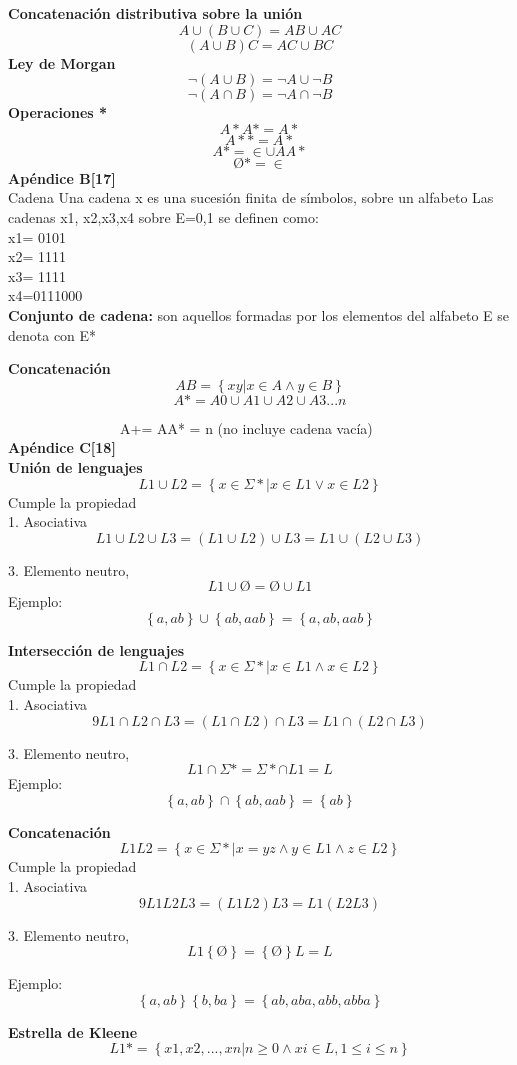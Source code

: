 \documentclass{llncs}
\begin{document}
   \textbf{Concatenación distributiva sobre la unión}
 \[
 A \cup (B \cup C) = AB \cup AC
  \]
\[
( A \cup B)  C = AC \cup BC
  \]
  \textbf{Ley de Morgan }
 \[
\neg (A \cup B)= \neg A \cup  \neg B
  \]
\[
\neg(A \cap B)= \neg A \cap  \neg B
  \] 
\textbf{Operaciones *}
\[ 
A* A* = A*
\]
\[ 
A** =A*
  \] 
\[ 
A*= { \in } \cup AA*
  \]
\[ 
Ø*={\in}
  \] 
  \textbf{Apéndice  B[17]} \\  
  Cadena
Una cadena x es una sucesión finita de símbolos, sobre un alfabeto
Las cadenas x1, x2,x3,x4 sobre E={0,1} se definen como:\\
x1= 0101 \\
x2= 1111 \\
x3= 1111 \\
x4=0111000 \\

\textbf{Conjunto de cadena:} son aquellos formadas por los elementos del alfabeto E  se denota con E*

\textbf{Concatenación}
\[
AB=
\left\lbrace
xy | x \in A \wedge y \in B
\right\rbrace
\]
\[
A*= A0 \cup A1 \cup A2 \cup A3 ... n
\]

\  \  \  \  \  \  \  \  \  \  \  \  \  \  \  \  A+= AA* = n  (no incluye cadena vacía) \\
\textbf{Apéndice C[18]} \\
\textbf{Unión de lenguajes}
\[
L1 \cup L2=
\left\lbrace
x \in \Sigma * |x \in L1 \vee x \in L2
\right\rbrace
\]
Cumple la propiedad \\
1. Asociativa 
 \[
 L1 \cup L2 \cup L3 = (L1 \cup L2 ) \cup L3 = L1 \cup (L2 \cup L3)  
  \]

3. Elemento neutro, 
 \[
 L1 \cup  Ø  =  Ø  \cup L1 
  \]
 Ejemplo:
 \[
\left\lbrace 
a, ab \right\rbrace \cup \left\lbrace 
ab, aab \right\rbrace = \left\lbrace 
a, ab, aab \right\rbrace
\]

\textbf{Intersección de lenguajes}
\[
L1 \cap L2=
\left\lbrace
x \in \Sigma * |x \in L1 \wedge x \in L2
\right\rbrace
\]
Cumple la propiedad \\
1. Asociativa
 \[9
    L1 \cap L2 \cap L3 = (L1 \cap L2) \cap L3 = L1 \cap (L2 \cap L3)
  \]

3. Elemento neutro, 
 \[
 L1 \cap  \Sigma *  =  \Sigma * \cap L1 = L 
  \]
 Ejemplo:
 \[
\left\lbrace 
a, ab \right\rbrace \cap \left\lbrace 
ab, aab \right\rbrace = \left\lbrace 
 ab \right\rbrace
\]



\textbf{Concatenación }
\[
L1L2=
\left\lbrace
x \in \Sigma * |x = yz \wedge y \in L1 \wedge z \in L2
\right\rbrace
\]
Cumple la propiedad \\
1. Asociativa
 \[9
    L1L2L3 = (L1L2)L3 = L1(L2L3)
  \]

3. Elemento neutro, 
 \[
 L1 \left\lbrace Ø \right\rbrace =  \left\lbrace Ø \right\rbrace L = L
  \]
 
 Ejemplo:
 \[
\left\lbrace 
a, ab \right\rbrace \left\lbrace 
b, ba \right\rbrace = \left\lbrace 
 ab, aba, abb, abba \right\rbrace
\]

\textbf{Estrella de Kleene}
 \[
 L1* = \left\lbrace x1,x2,...,xn | n\geq 0 \wedge xi \in L, 1 \leq i \leq n \right\rbrace 
  \]
\end{document}
